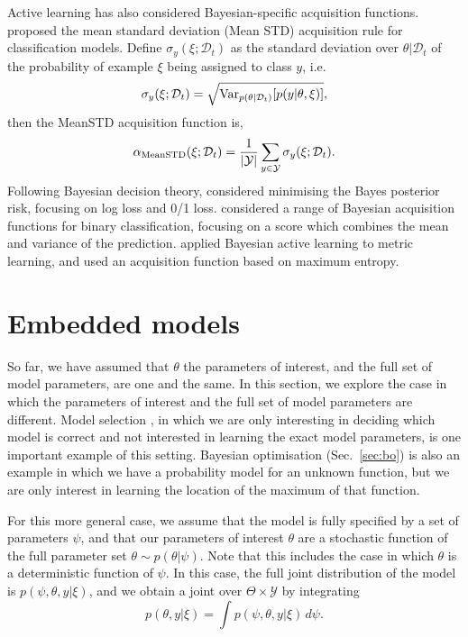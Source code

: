 \documentclass[a4paper, 10pt]{report}
\theoremstyle{plain}
\begin{document}
	Active learning has also considered Bayesian-specific acquisition functions.
	\citet{kendall2015bayesian} proposed the mean standard deviation (Mean STD) acquisition rule for classification models.
	Define $\sigma_y(\xi;\mathcal{D}_t)$ as the standard deviation over $\theta|\mathcal{D}_t$ of the probability of example $\xi$ being assigned to class $y$, i.e.~
	\begin{equation}
	\sigma_y(\xi;\mathcal{D}_t) = \sqrt{\mathrm{Var}_{p(\theta|\mathcal{D}_t)}[p(y|\theta,\xi)]},
	\end{equation}
	then the MeanSTD acquisition function is,
	\begin{equation}
	\alpha_\textup{MeanSTD}(\xi;\mathcal{D}_t) = \frac{1}{|\mathcal{Y}|}\sum_{y\in\mathcal{Y}} \sigma_y(\xi;\mathcal{D}_t).
	\end{equation}
	Following Bayesian decision theory, \citet{roy2001toward} considered minimising the Bayes posterior risk, focusing on log loss and 0/1 loss.  \citet{kapoor2007active} considered a range of Bayesian acquisition functions for binary classification, focusing on a score which combines the mean and variance of the prediction. \citet{yang2012bayesian} applied Bayesian active learning to metric learning, and used an acquisition function based on maximum entropy.
	
	
	
	
	\section{Embedded models}
	\label{sec:embedded}
	So far, we have assumed that $\theta$ the parameters of interest, and the full set of model parameters, are one and the same.
	In this section, we explore the case in which the parameters of interest and the full set of model parameters are different.
	Model selection \citep{vanlier2014optimal,drovandi2014sequential}, in which we are only interesting in deciding which model is correct and not interested in learning the exact model parameters, is one important example of this setting.
	Bayesian optimisation (Sec.~\ref{sec:bo}) is also an example in which we have a probability model for an unknown function, but we are only interest in learning the location of the maximum of that function.
	
	For this more general case, we assume that the model is fully specified by a set of parameters $\psi$, and that our parameters of interest $\theta$ are a stochastic function of the full parameter set $\theta\sim p(\theta|\psi)$. Note that this includes the case in which $\theta$ is a deterministic function of $\psi$. In this case, the full joint distribution of the model is $p(\psi,\theta,y|\xi)$, and we obtain a joint over $\Theta \times \mathcal{Y}$ by integrating 
	\begin{equation}
	p(\theta,y|\xi) = \int p(\psi,\theta,y|\xi)\,d\psi.
	\end{equation}
	
\end{document}

